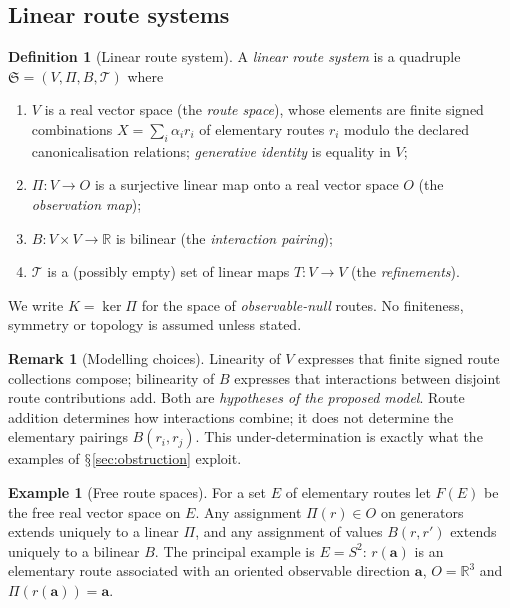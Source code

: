 \documentclass[11pt,a4paper]{article}
\renewcommand{\S}{\ensuremath{\mathsection}}
\newcommand{\RR}{\mathbb{R}}
\theoremstyle{plain}
\theoremstyle{definition}
\newtheorem{definition}[theorem]{Definition}
\newtheorem{example}[theorem]{Example}
\newtheorem{remark}[theorem]{Remark}
\begin{document}
\subsection{Linear route systems}
\begin{definition}[Linear route system]\label{def:system}
A \emph{linear route system} is a quadruple $\mathfrak S=(V,\Pi,B,\mathcal T)$ where
\begin{enumerate}[label=(R\arabic*)]
\item $V$ is a real vector space (the \emph{route space}), whose elements are finite signed combinations $X=\sum_i\alpha_i r_i$ of elementary routes $r_i$ modulo the declared canonicalisation relations; \emph{generative identity} is equality in $V$;
\item $\Pi\colon V\to O$ is a surjective linear map onto a real vector space $O$ (the \emph{observation map});
\item $B\colon V\times V\to\RR$ is bilinear (the \emph{interaction pairing});
\item $\mathcal T$ is a (possibly empty) set of linear maps $T\colon V\to V$ (the \emph{refinements}).
\end{enumerate}
We write $K=\ker\Pi$ for the space of \emph{observable-null} routes. No finiteness, symmetry or topology is assumed unless stated.
\end{definition}

\begin{remark}[Modelling choices]
Linearity of $V$ expresses that finite signed route collections compose; bilinearity of $B$ expresses that interactions between disjoint route contributions add.
Both are \emph{hypotheses of the proposed model}.
Route addition determines how interactions combine; it does not determine the elementary pairings $B(r_i,r_j)$.
This under-determination is exactly what the examples of \S\ref{sec:obstruction} exploit.
\end{remark}

\begin{example}[Free route spaces]\label{ex:free}
For a set $E$ of elementary routes let $F(E)$ be the free real vector space on $E$.
Any assignment $\Pi(r)\in O$ on generators extends uniquely to a linear $\Pi$, and any assignment of values $B(r,r')$ extends uniquely to a bilinear $B$.
The principal example is $E=S^2$: $r(\mathbf a)$ is an elementary route associated with an oriented observable direction $\mathbf a$, $O=\RR^3$ and $\Pi(r(\mathbf a))=\mathbf a$.
\end{example}
\end{document}
